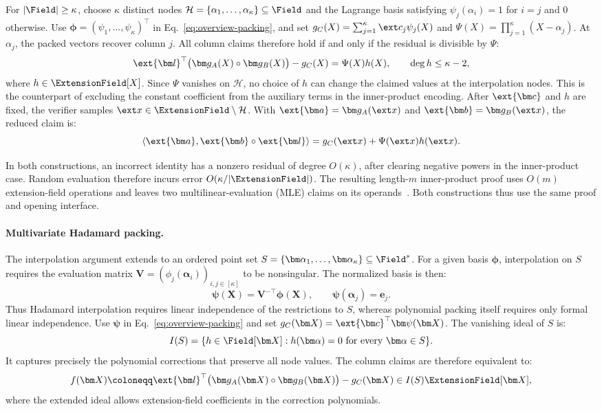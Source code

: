 For \(|\Field|\geq\kappa\), choose \(\kappa\) distinct nodes
\(\mathcal H=\{\alpha_1,\ldots,\alpha_\kappa\}\subseteq\Field\)
and the Lagrange basis satisfying
\(\psi_j(\alpha_i)=1\) for \(i=j\) and \(0\) otherwise.
Use \(\bm\phi=(\psi_1,\ldots,\psi_\kappa)^\top\) in
Eq.~\eqref{eq:overview-packing}, and set
\(g_C(X)=\sum_{j=1}^{\kappa}\ext c_j\psi_j(X)\) and
\(\Psi(X)=\prod_{j=1}^{\kappa}(X-\alpha_j)\).
At \(\alpha_j\), the packed vectors recover column \(j\).
All column claims therefore hold if and only if the residual is
divisible by \(\Psi\):
\begin{equation*}
    \ext{\bm l}^{\top}
      \bigl(\bm g_A(X)\circ\bm g_B(X)\bigr)-g_C(X)
    =\Psi(X)h(X),
    \qquad \deg h\leq\kappa-2,
\end{equation*}
where \(h\in\ExtensionField[X]\).
Since \(\Psi\) vanishes on \(\mathcal H\), no choice of \(h\)
can change the claimed values at the interpolation nodes.
This is the counterpart of excluding the constant coefficient
from the auxiliary terms in the inner-product encoding.
After \(\ext{\bm c}\) and \(h\) are fixed, the verifier samples
\(\ext x\in\ExtensionField\setminus\mathcal H\).
With \(\ext{\bm a}=\bm g_A(\ext x)\) and
\(\ext{\bm b}=\bm g_B(\ext x)\), the reduced claim is:
\[
    \langle\ext{\bm a},\ext{\bm b}\circ\ext{\bm l}\rangle
    =g_C(\ext x)+\Psi(\ext x)h(\ext x).
\]

In both constructions, an incorrect identity has a nonzero
residual of degree \(O(\kappa)\), after clearing negative powers
in the inner-product case. Random evaluation therefore incurs
error \(O(\kappa/|\ExtensionField|)\).
The resulting length-\(m\) inner-product proof uses \(O(m)\)
extension-field operations and leaves two multilinear-evaluation
(MLE) claims on its operands~\cite{asiacrypt/CCYY25}.
Both constructions thus use the same proof and opening interface.

\paragraph{Multivariate Hadamard packing.}
The interpolation argument extends to an ordered point set
\(S=\{\bm\alpha_1,\ldots,\bm\alpha_\kappa\}\subseteq\Field^s\).
For a given basis \(\bm\phi\), interpolation on \(S\) requires
the evaluation matrix \(\bm V=(\phi_j(\bm\alpha_i))_{i,j\in[\kappa]}\)
to be nonsingular. The normalized basis is then:
\[
    \bm\psi(\bm X)=\bm V^{-\top}\bm\phi(\bm X),
    \qquad
    \bm\psi(\bm\alpha_j)=\bm e_j.
\]
Thus Hadamard interpolation requires linear independence of the
restrictions to \(S\), whereas polynomial packing itself requires
only formal linear independence.
Use \(\bm\psi\) in Eq.~\eqref{eq:overview-packing} and set
\(g_C(\bm X)=\ext{\bm c}^{\top}\bm\psi(\bm X)\).
The vanishing ideal of \(S\) is:
\[
    I(S)=\{h\in\Field[\bm X]:
          h(\bm\alpha)=0\text{ for every }\bm\alpha\in S\}.
\]
It captures precisely the polynomial corrections that preserve
all node values. The column claims are therefore equivalent to:
\[
    f(\bm X)\coloneqq
    \ext{\bm l}^{\top}
      \bigl(\bm g_A(\bm X)\circ\bm g_B(\bm X)\bigr)
      -g_C(\bm X)
    \in I(S)\ExtensionField[\bm X],
\]
where the extended ideal allows extension-field coefficients in
the correction polynomials.

